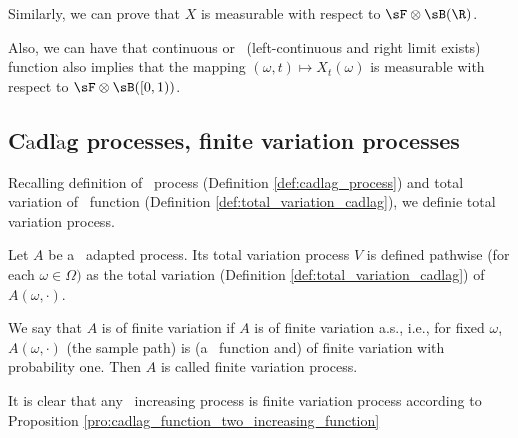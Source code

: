 
\begin{remark}
Similarly, we can prove that $X$ is measurable with respect to $\sF\otimes \sB(\R)$.

Also, we can have that continuous or \ladcag\ (left-continuous and right limit exists) function also implies that the mapping $(\omega, t) \mapsto X_t(\omega)$ is measurable with respect to $\sF\otimes \sB([0, 1))$.
\end{remark}

\subsection{C$\grave{\text{a}}$dl$\grave{\text{a}}$g processes, finite variation processes}

Recalling definition of \cadlag\ process (Definition \ref{def:cadlag_process}) and total variation of \cadlag\ function (Definition \ref{def:total_variation_cadlag}), we definie total variation process.

\begin{definition}\label{def:total_variation_process}
Let $A$ be a \cadlag\ adapted process. Its total variation process $V$ is defined pathwise (for each $\omega \in \Omega)$ as the total variation (Definition \ref{def:total_variation_cadlag}) of $A(\omega, \cdot)$.

We say that $A$ is of finite variation if $A$ is of finite variation a.s., i.e., for fixed $\omega$, $A(\omega, \cdot)$ (the sample path) is (a \cadlag\ function and) of finite variation with probability one. %
Then $A$ is called finite variation process.
\end{definition}

\begin{example}\label{exa:cadlag_increasing_process_is_of_finite_variation}
It is clear that any \cadlag\ increasing process is finite variation process according to Proposition \ref{pro:cadlag_function_two_increasing_function}
\end{example}

